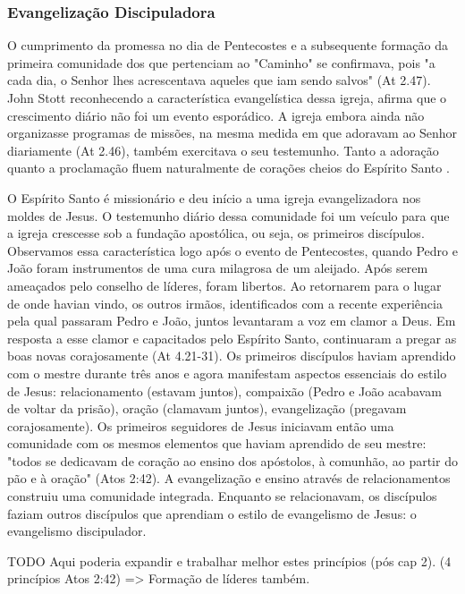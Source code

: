\documentclass[
	12pt,				%
	openright,			%
	twoside,			%
	a4paper,			%
	english,			%
	french,				%
	spanish,			%
	brazil				%
	]{abntex2}
\begin{document}
\subsubsection{Evangelização Discipuladora}

O cumprimento da promessa no dia de Pentecostes e a subsequente formação da primeira comunidade dos que pertenciam ao "Caminho" se confirmava, pois "a cada dia, o Senhor lhes acrescentava aqueles que iam sendo salvos" (At 2.47). John Stott reconhecendo a característica evangelística dessa igreja, afirma que o crescimento diário não foi um evento esporádico. A igreja embora ainda não organizasse programas de missões, na mesma medida em que adoravam ao Senhor diariamente (At 2.46), também exercitava o seu testemunho. Tanto a adoração quanto a proclamação fluem naturalmente de corações cheios do Espírito Santo \cite[118-119]{stott}. 

O Espírito Santo é missionário e deu início a uma igreja evangelizadora nos moldes de Jesus. O testemunho diário dessa comunidade foi um veículo para que a igreja crescesse \cite[78]{stott} sob a fundação apostólica, ou seja, os primeiros discípulos. Observamos essa característica logo após o evento de Pentecostes, quando Pedro e João foram instrumentos de uma cura milagrosa de um aleijado. Após serem ameaçados pelo conselho de líderes, foram libertos. Ao retornarem para o lugar de onde havian vindo, os outros irmãos, identificados com a recente experiência pela qual passaram Pedro e João, juntos levantaram a voz em clamor a Deus. Em resposta a esse clamor e capacitados pelo Espírito Santo, continuaram a pregar as boas novas corajosamente (At 4.21-31). Os primeiros discípulos haviam aprendido com o mestre durante três anos e agora manifestam aspectos essenciais do estilo de Jesus: relacionamento (estavam juntos), compaixão (Pedro e João acabavam de voltar da prisão), oração (clamavam juntos), evangelização (pregavam corajosamente). Os primeiros seguidores de Jesus iniciavam então uma comunidade com os mesmos elementos que haviam aprendido de seu mestre: "todos se dedicavam de coração ao ensino dos apóstolos, à comunhão, ao partir do pão e à oração" (Atos 2:42). A evangelização e ensino através de relacionamentos construiu uma comunidade integrada. Enquanto se relacionavam, os discípulos faziam outros discípulos que aprendiam o estilo de evangelismo de Jesus: o evangelismo discipulador.

TODO Aqui poderia expandir e trabalhar melhor estes princípios (pós cap 2). (4 princípios Atos 2:42) => Formação de líderes também.
\end{document}
